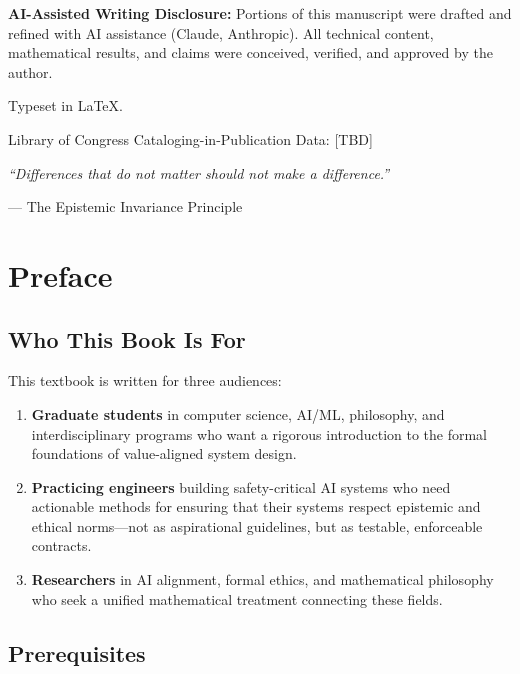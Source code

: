 \documentclass[12pt,letterpaper,twoside,openright]{book}
\theoremstyle{plain}
\theoremstyle{definition}
\theoremstyle{remark}
\begin{document}
\vspace{1em}
\noindent\textbf{AI-Assisted Writing Disclosure:} Portions of this manuscript were drafted and refined with AI assistance (Claude, Anthropic). All technical content, mathematical results, and claims were conceived, verified, and approved by the author.

\vspace{1em}
\noindent Typeset in \LaTeX.

\vspace{1em}
\noindent Library of Congress Cataloging-in-Publication Data: [TBD]
\cleardoublepage

\thispagestyle{empty}
\vspace*{3cm}
\begin{center}
\textit{``Differences that do not matter should not make a difference.''}

\vspace{0.5cm}
--- The Epistemic Invariance Principle
\end{center}
\vfill
\cleardoublepage

\chapter{Preface}

\section*{Who This Book Is For}

This textbook is written for three audiences:

\begin{enumerate}
    \item \textbf{Graduate students} in computer science, AI/ML, philosophy, and interdisciplinary programs who want a rigorous introduction to the formal foundations of value-aligned system design.
    \item \textbf{Practicing engineers} building safety-critical AI systems who need actionable methods for ensuring that their systems respect epistemic and ethical norms---not as aspirational guidelines, but as testable, enforceable contracts.
    \item \textbf{Researchers} in AI alignment, formal ethics, and mathematical philosophy who seek a unified mathematical treatment connecting these fields.
\end{enumerate}

\section*{Prerequisites}
\end{document}
